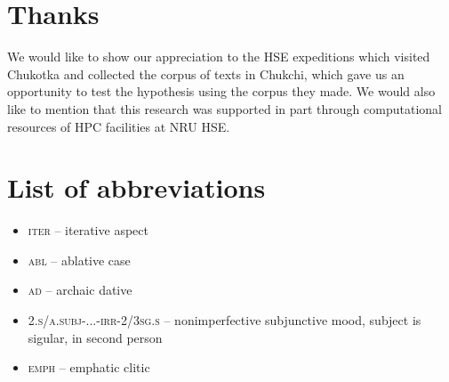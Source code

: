 \documentclass[leqno]{article}
\begin{document}
\clearpage
\section*{Thanks}
We would like to show our appreciation to the HSE expeditions which visited Chukotka and collected the corpus of texts in Chukchi, which gave us an opportunity to test the hypothesis using the corpus they made. We would also like to mention that this research was supported in part through computational resources of HPC facilities at NRU HSE.

\clearpage
\appendix

\section{List of abbreviations}
\begin{itemize}
    \item \textsc{iter} – iterative aspect
    \item \textsc{abl} – ablative case
    \item \textsc{ad} – archaic dative
    \item \textsc{2.s/a.subj-...-irr-2/3sg.s} – nonimperfective subjunctive mood, subject is sigular, in second person
    \item \textsc{emph} – emphatic clitic
\end{itemize}

\printbibliography
\end{document}
